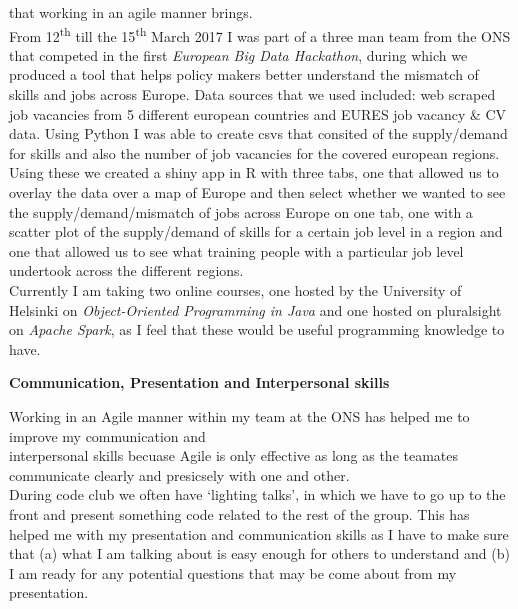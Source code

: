 \documentclass[10pt]{res}
\begin{document}
\begin{resume}
\begin{addmargin}[2em]{0em}
    that working in an agile manner brings.
    \\[4pt]
    From 12\textsuperscript{th} till the 15\textsuperscript{th} March 2017
    I was part of a three man team from the ONS that competed in the first
    \textit{European Big Data Hackathon}, during which we produced a tool that
    helps policy makers better understand the mismatch of skills and jobs
    across Europe. Data sources that we used included: web scraped job 
    vacancies from 5 different european countries and EURES job vacancy \& CV
    data. Using Python I was able to create csvs that consited of the
    supply/demand for skills and also the number of job vacancies for the
    covered european regions.  Using these we created a shiny app in R with
    three tabs, one that allowed us to overlay the data over a map of Europe
    and then select whether we wanted to see the supply/demand/mismatch of jobs
    across Europe on one tab, one with a scatter plot of the supply/demand of
    skills for a certain job level in a region and one that allowed us to see
    what training people with a particular job level undertook across the
    different regions.
    \\[4pt]
    Currently I am taking two online courses, one hosted by the University of
    Helsinki on \textit{Object-Oriented Programming in Java} and one hosted on
    pluralsight on \textit{Apache Spark}, as I feel that these would
    be useful programming knowledge to have.
\end{addmargin}

\vspace{-5pt}
\textbf{Communication, Presentation and Interpersonal skills}
\begin{addmargin}[2em]{0em}
    Working in an Agile manner within my team at the ONS has helped me to
    improve my communication and \\ interpersonal skills becuase Agile is only
    effective as long as the teamates communicate clearly and presicsely with
    one and other.
    \\[4pt]
    During code club we often have `lighting talks', in which we have to go
    up to the front and present something code related to the rest of the group.
    This has helped me with my presentation and communication skills as I have
    to make sure that (a) what I am talking about is easy enough for others to
    understand and (b) I am ready for any potential questions that may be come
    about from my presentation.
\end{addmargin}


\end{resume}
\end{document}
